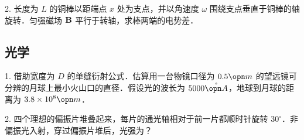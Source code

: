2. 长度为 $L$ 的铜棒以距端点 $x$ 处为支点，并以角速度 $\omega$ 围绕支点垂直于铜棒的轴旋转．匀强磁场 $\bf B$ 平行于转轴，求棒两端的电势差．
\subsection{光学}
1. 借助宽度为 $D$ 的单缝衍射公式．估算用一台物镜口径为 $0.5 \opn m$ 的望远镜可分辨的月球上最小火山口的直径．假设光的波长为 $5000\mathring{\opn A}$，地球到月球的距离为 $3.8\times 10^8 \opn m$．

2. 四个理想的偏振片堆叠起来，每片的通光轴相对于前一片都顺时针旋转 $30^\circ$．非偏振光入射，穿过偏振片堆后，光强为？